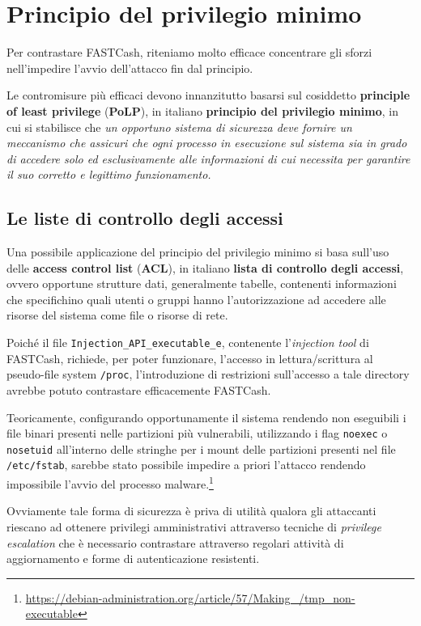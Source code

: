 \documentclass[10pt,a4paper, titlepage]{report}
\begin{document}
\section{Principio del privilegio minimo}

Per contrastare FASTCash, riteniamo molto efficace concentrare gli sforzi nell'impedire l'avvio dell'attacco fin dal principio. 

Le contromisure più efficaci devono innanzitutto basarsi sul cosiddetto \textbf{principle of least privilege} (\textbf{PoLP}), in italiano \textbf{principio del privilegio minimo}, in cui si stabilisce che \textit{un opportuno sistema di sicurezza deve fornire un meccanismo che assicuri che ogni processo in esecuzione sul sistema sia in grado di accedere solo ed esclusivamente alle informazioni di cui necessita per garantire il suo corretto e legittimo funzionamento.}

\subsection{Le liste di controllo degli accessi}

Una possibile applicazione del principio del privilegio minimo si basa sull'uso delle \textbf{access control list} (\textbf{ACL}), in italiano \textbf{lista di controllo degli accessi}, ovvero opportune strutture dati, generalmente tabelle, contenenti informazioni che specifichino quali utenti o gruppi hanno l'autorizzazione ad accedere alle risorse del sistema come file o risorse di rete.

Poiché il file \texttt{Injection\_API\_executable\_e}, contenente l'\textit{injection tool} di FASTCash, richiede, per poter funzionare, l'accesso in lettura/scrittura al pseudo-file system \texttt{/proc}, l'introduzione di restrizioni sull'accesso a tale directory avrebbe potuto contrastare efficacemente FASTCash.

Teoricamente, configurando opportunamente il sistema rendendo non eseguibili i file binari presenti nelle partizioni più vulnerabili, utilizzando i flag \texttt{noexec} o \texttt{nosetuid} all'interno delle stringhe per i mount delle partizioni presenti nel file \texttt{/etc/fstab}, sarebbe stato possibile impedire a priori l'attacco rendendo impossibile l'avvio del processo malware.\footnote{\url{https://debian-administration.org/article/57/Making\_/tmp\_non-executable}}

Ovviamente tale forma di sicurezza è priva di utilità qualora gli attaccanti riescano ad ottenere privilegi amministrativi attraverso tecniche di \textit{privilege escalation} che è necessario contrastare attraverso regolari attività di aggiornamento e forme di autenticazione resistenti.
\end{document}
